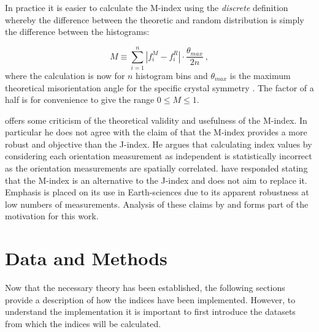 \documentclass[a4paper,12pt]{report}
\numberwithin{equation}{chapter}
\begin{document}
In practice it is easier to calculate the M-index using the \emph{discrete} definition whereby the difference between the theoretic and random distribution is simply the difference between the histograms:

\begin{equation} \label{eq:Mindex_disc}
M \equiv \sum_{i=1}^n | f_i^M - f_i^R | \cdot \frac{\theta_{max}}{2n}\ ,
\end{equation} 
where the calculation is now for $n$ histogram bins and $\theta_{max}$ is the maximum theoretical misorientation angle for the specific crystal symmetry \citep[for discussion on misorientation angle distirbutions for various crystal symmetries see][and references therein]{Grimmer1979,Wheeler2001}. The factor of a half is for convenience to give the range $0 \leq M \leq 1$. 

  

\cite{Schaeben2007} offers some criticism of the theoretical validity and usefulness of the M-index. In particular he does not agree with the claim of \cite{Skemer} that the M-index provides a more robust and objective than the J-index. He argues that calculating index values by considering each orientation measurement as independent is statistically incorrect as the orientation measurements are spatially correlated. \cite{Skemer2007reply} have responded stating that the M-index is an alternative to the J-index and does not aim to replace it. Emphasis is placed on its use in Earth-sciences due to its apparent robustness at low numbers of measurements. Analysis of these claims by \cite{Skemer} and \cite{Skemer2007reply} forms part of the motivation for this work.  

\chapter{Data and Methods} \label{chap:methods}
\vspace{-1cm}

Now that the necessary theory has been established, the following sections provide a description of how the indices have been implemented. However, to understand the implementation it is important to first introduce the datasets from which the indices will be calculated.  
\end{document}
